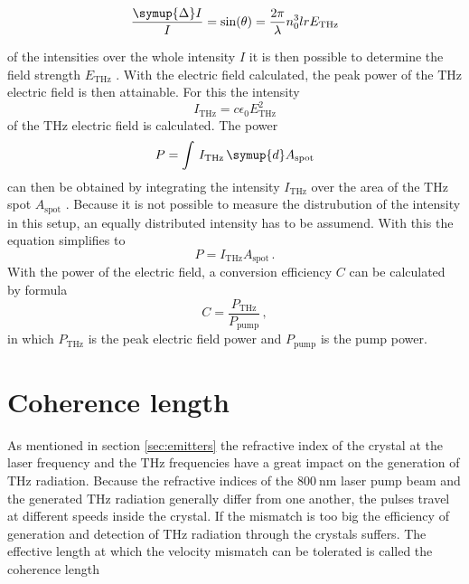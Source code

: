 \begin{equation}
    \frac{\symup{\Delta}I}{I} = \text{sin}(\theta) = \frac{2\pi}{\lambda} n_0^3 l r E_\text{THz}
    \label{eq:electricfield_A_B}
\end{equation}

of the intensities over the whole intensity $I$ it is then possible to determine the field strength $E_\text{THz}$ \cite{THZ_eltric_field}.
With the electric field calculated, the peak power of the $\si{\tera\hertz}$ electric field is then attainable.
For this the intensity
\begin{equation}
    I_\text{THz} = c \epsilon_0 E_\text{THz}^2
    \label{eq:intensity}
\end{equation}
of the $\si{\tera\hertz}$ electric field is calculated.
The power 
\begin{equation}
    P = \int\, I_\text{THz} \,\symup{d}A_\text{spot}
\end{equation}
can then be obtained by integrating the intensity $I_\text{THz}$ over the area of the $\si{\tera\hertz}$ spot $A_\text{spot}$ \cite{griffiths}.
Because it is not possible to measure the distrubution of the intensity in this setup, an equally distributed intensity has to be assumend.
With this the equation simplifies to 
\begin{equation}
    P = I_\text{THz}A_\text{spot}\,.
    \label{eq:power}
\end{equation}
With the power of the electric field, a conversion efficiency $C$ can be calculated by formula
\begin{equation}
    C = \frac{P_\text{THz}}{P_\text{pump}} \, ,
    \label{eq:conversion}
\end{equation}
in which $P_\text{THz}$ is the peak electric field power and $P_\text{pump}$ is the pump power.


\section{Coherence length}
\label{sec:coherence_length}
As mentioned in section \ref{sec:emitters} the refractive index of the crystal at the laser frequency and the $\si{\tera\hertz}$ frequencies have a great impact on the generation of $\si{\tera\hertz}$ radiation.
Because the refractive indices of the $\SI{800}{\nano\meter}$ laser pump beam and the generated $\si{\tera\hertz}$ radiation generally differ from one another, the pulses travel at different speeds inside the crystal.
If the mismatch is too big the efficiency of generation and detection of $\si{\tera\hertz}$ radiation through the crystals suffers.
The effective length at which the velocity mismatch can be tolerated is called the coherence length

